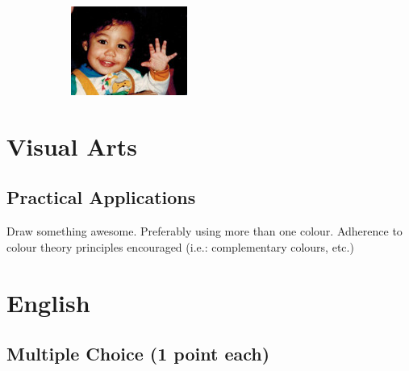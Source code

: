 \documentclass[11pt]{exam}
\begin{document}
\begin{questions}
\begin{figure}[h]
\begin{subfigure}[b]{0.3\textwidth}
        \caption{\underline{\hspace{2cm}}} 
        \label{fig:snake}
    \end{subfigure}
    \begin{subfigure}[b]{0.3\textwidth}
        \includegraphics[width=\textwidth]{cute6}
        \caption{\underline{\hspace{2cm}}} 
        \label{fig:baby}
    \end{subfigure}  
\end{figure}
 


\newpage
\section{Visual Arts}
\subsection{Practical Applications}
\setcounter{question}{0}
\question Draw something awesome. Preferably using more than one colour. Adherence to colour theory principles encouraged (i.e.: complementary colours, etc.)
\vfill

\newpage
\section{English}
\subsection{Multiple Choice (1 point each)}


\end{questions}
\end{document}

